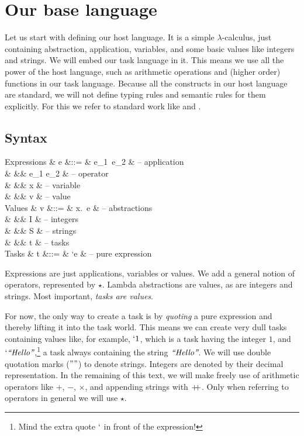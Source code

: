 
\section{Our base language}

Let us start with defining our host language.
It is a simple $\lambda$-calculus,
just containing abstraction, application, variables,
and some basic values like integers and strings.
We will embed our task language in it.
This means we use all the power of the host language,
such as arithmetic operations and (higher order) functions in our task language.
Because all the constructs in our host language are standard,
we will not define typing rules and semantic rules for them explicitly.
For this we refer to standard work like \textcite{Pierce:2002tp} and \textcite{Harper:2016uj}.


\subsection{Syntax}

\begin{grammar}
  Expressions
    & e &::= & e_1\ e_2       & – application \\
    &   &\mid& e_1 \star e_2  & – operator \\
    &   &\mid& x              & – variable \\
    &   &\mid& v              & – value \\
  Values
    & v &::= & \lambda x.\ e  & – abstractions \\
    &   &\mid& I              & – integers \\
    &   &\mid& S              & – strings \\
    &   &\mid& t              & – tasks \\
  Tasks
    & t &::= & `e             & – pure expression \\
\end{grammar}
Expressions are just applications, variables or values.
We add a general notion of operators, represented by $\star$.
Lambda abstractions are values, as are integers and strings.
Most important, \emph{tasks are values}.

For now, the only way to create a task is by \emph{quoting} a pure expression
and thereby lifting it into the task world.
This means we can create very dull tasks containing values like, for example, $`1$,
which is a task having the integer $1$,
and $`\textit{``Hello''}$,\footnote{
  Mind the extra quote $`$ in front of the expression!
}
a task always containing the string $\textit{``Hello''}$.
We will use double quotation marks ($""$) to denote strings.
Integers are denoted by their decimal representation.
In the remaining of this text,
we will make freely use of arithmetic operators like $+$, $-$, $\times$,
and appending strings with $+\!\!+$.
Only when referring to operators in general we will use $\star$.


